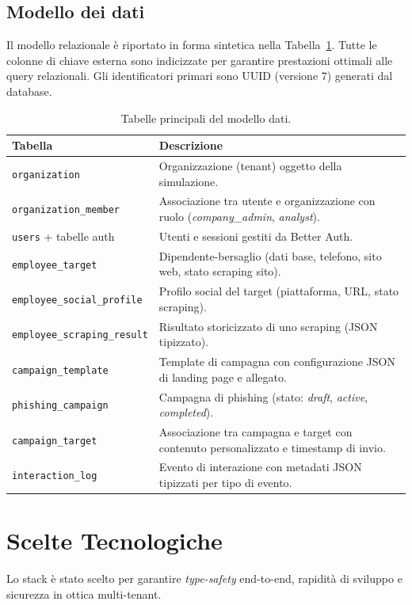 \documentclass[12pt,a4paper,oneside]{report}
\newcommand{\code}[1]{\texttt{\small #1}}
\begin{document}
\section{Modello dei dati}
Il modello relazionale \`e riportato in forma sintetica nella Tabella~\ref{tab:schema}.
Tutte le colonne di chiave esterna sono indicizzate per garantire prestazioni ottimali
alle query relazionali. Gli identificatori primari sono UUID (versione 7) generati dal
database.

\begin{table}[h]
\centering
\caption{Tabelle principali del modello dati.}
\label{tab:schema}
\small
\begin{tabular}{@{}p{4.2cm}p{9.2cm}@{}}
\toprule
\textbf{Tabella} & \textbf{Descrizione} \\
\midrule
\code{organization} & Organizzazione (tenant) oggetto della simulazione. \\
\code{organization\_member} & Associazione tra utente e organizzazione con ruolo (\emph{company\_admin}, \emph{analyst}). \\
\code{users} + tabelle auth & Utenti e sessioni gestiti da Better Auth. \\
\code{employee\_target} & Dipendente-bersaglio (dati base, telefono, sito web, stato scraping sito). \\
\code{employee\_social\_profile} & Profilo social del target (piattaforma, URL, stato scraping). \\
\code{employee\_scraping\_result} & Risultato storicizzato di uno scraping (JSON tipizzato). \\
\code{campaign\_template} & Template di campagna con configurazione JSON di landing page e allegato. \\
\code{phishing\_campaign} & Campagna di phishing (stato: \emph{draft}, \emph{active}, \emph{completed}). \\
\code{campaign\_target} & Associazione tra campagna e target con contenuto personalizzato e timestamp di invio. \\
\code{interaction\_log} & Evento di interazione con metadati JSON tipizzati per tipo di evento. \\
\bottomrule
\end{tabular}
\end{table}

\chapter{Scelte Tecnologiche}
Lo stack \`e stato scelto per garantire \emph{type-safety} end-to-end, rapidit\`a di
sviluppo e sicurezza in ottica multi-tenant.
\end{document}
